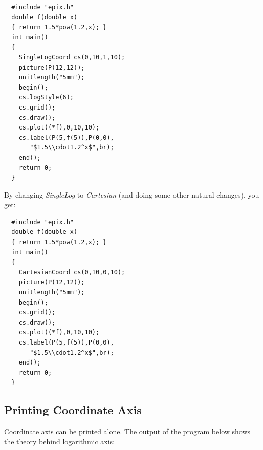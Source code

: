 \documentclass[12pt,a4paper]{article}
\begin{document}

  \begin{minipage}{7.5cm}
    \begin{lstlisting}
  #include "epix.h"
  double f(double x)
  { return 1.5*pow(1.2,x); }
  int main()
  {
    SingleLogCoord cs(0,10,1,10);
    picture(P(12,12));
    unitlength("5mm");
    begin();
    cs.logStyle(6);
    cs.grid();
    cs.draw();
    cs.plot((*f),0,10,10);
    cs.label(P(5,f(5)),P(0,0),
       "$1.5\\cdot1.2^x$",br);
    end();
    return 0;
  }
    \end{lstlisting}
  \end{minipage}
  \begin{minipage}{5.5cm}
    
  \end{minipage}

  By changing \textit{SingleLog} to \textit{Cartesian} (and doing some
  other natural changes), you get:

  \begin{minipage}{7.5cm}
    \begin{lstlisting}
  #include "epix.h"
  double f(double x)
  { return 1.5*pow(1.2,x); }
  int main()
  {
    CartesianCoord cs(0,10,0,10);
    picture(P(12,12));
    unitlength("5mm");
    begin();
    cs.grid();
    cs.draw();
    cs.plot((*f),0,10,10);
    cs.label(P(5,f(5)),P(0,0),
       "$1.5\\cdot1.2^x$",br);
    end();
    return 0;
  }
    \end{lstlisting}
  \end{minipage}
  \begin{minipage}{5.5cm}
    
  \end{minipage}


  \subsection{Printing Coordinate Axis}

  Coordinate axis can be printed alone. The output of the program
  below shows the theory behind logarithmic axis:
\end{document}
